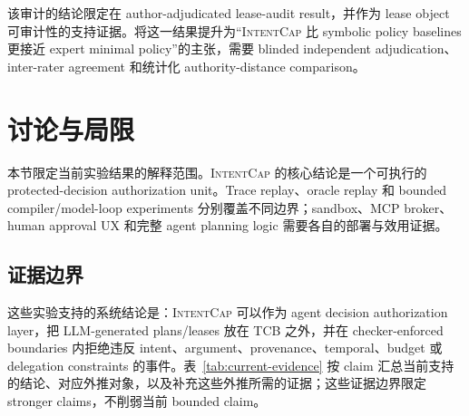 \documentclass[UTF8,a4paper,11pt]{ctexart}
\newcommand{\sys}{\textsc{IntentCap}\xspace}
\begin{document}
该审计的结论限定在 author-adjudicated lease-audit result，并作为 lease object 可审计性的支持证据。将这一结果提升为“\sys 比 symbolic policy baselines 更接近 expert minimal policy”的主张，需要 blinded independent adjudication、inter-rater agreement 和统计化 authority-distance comparison。

\section{讨论与局限}
\label{sec:evidence-status}

本节限定当前实验结果的解释范围。\sys 的核心结论是一个可执行的 protected-decision authorization unit。Trace replay、oracle replay 和 bounded compiler/model-loop experiments 分别覆盖不同边界；sandbox、MCP broker、human approval UX 和完整 agent planning logic 需要各自的部署与效用证据。

\subsection{证据边界}
这些实验支持的系统结论是：\sys 可以作为 agent decision authorization layer，把 LLM-generated plans/leases 放在 TCB 之外，并在 checker-enforced boundaries 内拒绝违反 intent、argument、provenance、temporal、budget 或 delegation constraints 的事件。表~\ref{tab:current-evidence} 按 claim 汇总当前支持的结论、对应外推对象，以及补充这些外推所需的证据；这些证据边界限定 stronger claims，不削弱当前 bounded claim。
\end{document}
